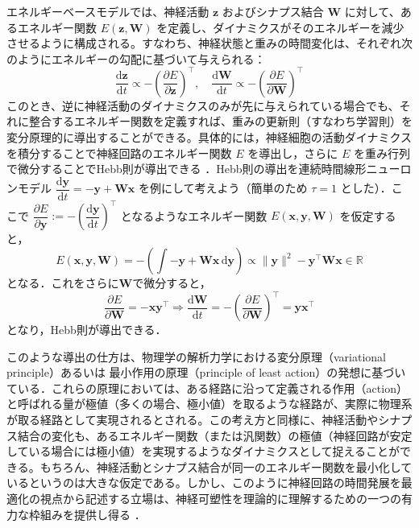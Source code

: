 \documentclass[titlepage]{ltjsbook}
\begin{document}
エネルギーベースモデルでは、神経活動 $\mathbf{z}$ およびシナプス結合 $\mathbf{W}$ に対して、あるエネルギー関数 $E(\mathbf{z}, \mathbf{W})$ を定義し、ダイナミクスがそのエネルギーを減少させるように構成される。すなわち、神経状態と重みの時間変化は、それぞれ次のようにエネルギーの勾配に基づいて与えられる：
\begin{equation}
\frac{\mathrm{d}\mathbf{z}}{\mathrm{d}t}\propto-\left(\frac{\partial E}{\partial \mathbf{z}}\right)^\top,\quad \frac{\mathrm{d} \mathbf{W}}{\mathrm{d}t}\propto-\left(\frac{\partial E}{\partial \mathbf{W}}\right)^\top
\end{equation}
このとき、逆に神経活動のダイナミクスのみが先に与えられている場合でも、それに整合するエネルギー関数を定義すれば、重みの更新則（すなわち学習則）を変分原理的に導出することができる。具体的には，神経細胞の活動ダイナミクスを積分することで神経回路のエネルギー関数 $E$ を導出し，さらに $E$ を重み行列で微分することでHebb則が導出できる \citep{Isomura2020-sn}．Hebb則の導出を連続時間線形ニューロンモデル $\dfrac{\mathrm{d}\mathbf{y}}{\mathrm{d}t}=-\mathbf{y}+\mathbf{W}\mathbf{x}$ を例にして考えよう（簡単のため $\tau=1$ とした）．ここで $\dfrac{\partial E}{\partial\mathbf{y}}:=-\left(\dfrac{\mathrm{d}\mathbf{y}}{\mathrm{d}t}\right)^\top$ となるようなエネルギー関数 $E(\mathbf{x}, \mathbf{y}, \mathbf{W})$ を仮定すると，
\begin{equation}
E(\mathbf{x}, \mathbf{y}, \mathbf{W})=-\left(\int -\mathbf{y}+\mathbf{W}\mathbf{x}\,\mathrm{d}\mathbf{y}\right)\propto\|\mathbf{y}\|^2-\mathbf{y}^\top \mathbf{W}\mathbf{x} \in \mathbb{R}
\end{equation}
となる．これをさらに$\mathbf{W}$で微分すると，
\begin{equation}
\dfrac{\partial E}{\partial\mathbf{W}}=-\mathbf{x}\mathbf{y}^\top\Rightarrow
\frac{\mathrm{d}\mathbf{W}}{\mathrm{d}t}=-\left(\frac{\partial E}{\partial \mathbf{W}}\right)^\top=\mathbf{y}\mathbf{x}^\top
\end{equation}
となり，Hebb則が導出できる．

このような導出の仕方は、物理学の解析力学における変分原理（variational principle）あるいは 最小作用の原理（principle of least action）の発想に基づいている．これらの原理においては、ある経路に沿って定義される作用（action）と呼ばれる量が極値（多くの場合、極小値）を取るような経路が、実際に物理系が取る経路として実現されるとされる。この考え方と同様に、神経活動やシナプス結合の変化も、あるエネルギー関数（または汎関数）の極値（神経回路が安定している場合には極小値）を実現するようなダイナミクスとして捉えることができる。もちろん、神経活動とシナプス結合が同一のエネルギー関数を最小化しているというのは大きな仮定である。しかし、このように神経回路の時間発展を最適化の視点から記述する立場は、神経可塑性を理論的に理解するための一つの有力な枠組みを提供し得る \citep{isomura2023experimental}．
\end{document}

